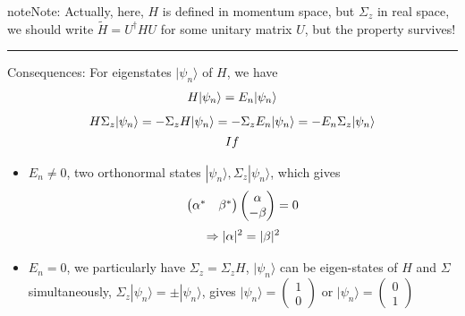 \documentclass[letterpaper,10pt,english]{sphinxmanual}
\begin{document}
\begin{notice}{note}{Note:}
Actually, here, \(H\) is defined in momentum space, but
\(\Sigma_z\) in real space, we should write
\(\tilde{H}=U^\dagger H U\) for some unitary matrix \(U\), but
the property survives!
\end{notice}


\bigskip\hrule{}\bigskip


Consequences: For eigenstates \(|\psi_n\rangle\) of \(H\), we
have
\begin{gather}
\begin{split}H|\psi_n\rangle=E_n|\psi_n\rangle\end{split}\notag
\end{gather}\begin{gather}
\begin{split}H\Sigma_z|\psi_n\rangle=-\Sigma_zH|\psi_n\rangle=-\Sigma_zE_n|\psi_n\rangle=-E_n\Sigma_z|\psi_n\rangle\end{split}\notag\\\begin{split}If\end{split}\notag
\end{gather}\begin{itemize}
\item {} 
\(E_n\neq 0\), two orthonormal states
\(|\psi_n\rangle, \Sigma_z|\psi_n\rangle\), which gives
\begin{gather}
\begin{split}\begin{pmatrix}\alpha^* &\beta^*\end{pmatrix}\begin{pmatrix}\alpha\\-\beta\end{pmatrix}=0\end{split}\notag
\end{gather}\begin{gather}
\begin{split}\Rightarrow |\alpha|^2=|\beta|^2\end{split}\notag
\end{gather}
\item {} 
\(E_n=0\), we particularly have \(\Sigma_z=\Sigma_zH\),
\(|\psi_n\rangle\) can be eigen-states of \(H\) and
\(\Sigma\) simultaneously,
\(\Sigma_z|\psi_n\rangle=\pm|\psi_n\rangle\), gives
\(|\psi_n\rangle=\begin{pmatrix}1 \\0\end{pmatrix}\) or
\(|\psi_n\rangle=\begin{pmatrix}0 \\1\end{pmatrix}\)

\end{itemize}
\end{document}
